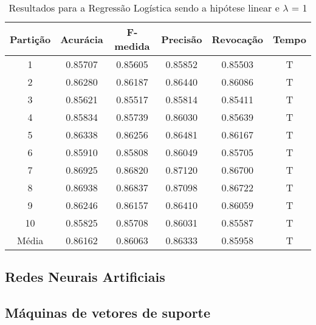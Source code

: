 \begin{table}[h]
\centering
\caption{Resultados para a Regressão Logística sendo a hipótese linear e \(\lambda\) = 1}
\vspace{0.2cm}
\begin{tabular}{c|c|c|c|c|c}
Partição & Acurácia & F-medida & Precisão & Revocação & Tempo \\
\hline
1  & 0.85707 & 0.85605 & 0.85852 & 0.85503 & T \\      
2  & 0.86280 & 0.86187 & 0.86440 & 0.86086 & T \\      
3  & 0.85621 & 0.85517 & 0.85814 & 0.85411 & T \\      
4  & 0.85834 & 0.85739 & 0.86030 & 0.85639 & T \\      
5  & 0.86338 & 0.86256 & 0.86481 & 0.86167 & T \\      
6  & 0.85910 & 0.85808 & 0.86049 & 0.85705 & T \\      
7  & 0.86925 & 0.86820 & 0.87120 & 0.86700 & T \\    
8  & 0.86938 & 0.86837 & 0.87098 & 0.86722 & T \\      
9  & 0.86246 & 0.86157 & 0.86410 & 0.86059 & T \\      
10 & 0.85825 & 0.85708 & 0.86031 & 0.85587 & T \\
\hline
Média & 0.86162 & 0.86063 & 0.86333 & 0.85958 & T 

\end{tabular} 
\label{table:resultadosRL}
\end{table}

\subsection{Redes Neurais Artificiais}

\subsection{Máquinas de vetores de suporte}

